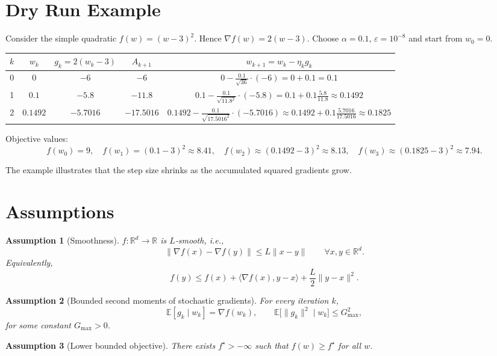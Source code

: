 \documentclass{article}
\newtheorem{assumption}{Assumption}
\begin{document}
\section*{Dry Run Example}
Consider the simple quadratic $f(w)=(w-3)^2$.
Hence $\nabla f(w)=2(w-3)$.  
Choose $\alpha=0.1$, $\varepsilon=10^{-8}$ and start from $w_0=0$.

\begin{center}
\begin{tabular}{c|c|c|c|c}
$k$ & $w_k$ & $g_k=2(w_k-3)$ & $A_{k+1}$ & $w_{k+1}=w_k-\eta_k g_k$\\ \hline
0 & $0$ & $-6$ & $-6$ & $\displaystyle 0-\frac{0.1}{\sqrt{36}}\cdot(-6)=0+0.1=0.1$\\[4pt]
1 & $0.1$ & $-5.8$ & $-11.8$ & $\displaystyle 0.1-\frac{0.1}{\sqrt{11.8^{2}}}\cdot(-5.8)
               =0.1+0.1\frac{5.8}{11.8}\approx0.1492$\\[4pt]
2 & $0.1492$ & $-5.7016$ & $-17.5016$ &
 $\displaystyle 0.1492-\frac{0.1}{\sqrt{17.5016^{2}}}\cdot(-5.7016)
 \approx0.1492+0.1\frac{5.7016}{17.5016}\approx0.1825$
\end{tabular}
\end{center}

Objective values:
\[
f(w_0)=9,\quad f(w_1)=(0.1-3)^2\approx8.41,\quad
f(w_2)\approx(0.1492-3)^2\approx8.13,\quad
f(w_3)\approx(0.1825-3)^2\approx7.94 .
\]

The example illustrates that the step size shrinks as the accumulated squared gradients grow.

\newpage
\section*{Assumptions}
\begin{assumption}[Smoothness]\label{ass:smooth}
$f:\mathbb{R}^d\rightarrow\mathbb{R}$ is $L$‑smooth, i.e.,
\[
\|\nabla f(x)-\nabla f(y)\|\le L\|x-y\|\qquad\forall x,y\in\mathbb{R}^d .
\]
Equivalently,
\[
f(y)\le f(x)+\langle\nabla f(x),y-x\rangle+\frac{L}{2}\|y-x\|^{2}.
\]
\end{assumption}
\begin{assumption}[Bounded second moments of stochastic gradients]\label{ass:bounded}
For every iteration $k$,
\[
\mathbb{E}[g_k\mid w_k]=\nabla f(w_k),\qquad 
\mathbb{E}\big[\|g_k\|^{2}\mid w_k\big]\le G_{\max }^{2},
\]
for some constant $G_{\max}>0$.
\end{assumption}
\begin{assumption}[Lower bounded objective]\label{ass:lower}
There exists $f^{\star}>-\infty$ such that $f(w)\ge f^{\star}$ for all $w$.
\end{assumption}
\end{document}
